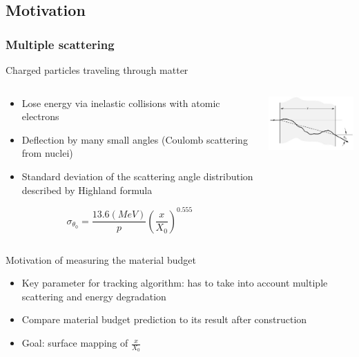 \documentclass{beamer}
\begin{document}
  \subsection{Motivation}

  \begin{frame}
    \frametitle{Multiple scattering}
    
    \vspace{-0.4cm} 
    \begin{block}{Charged particles traveling through matter}
      \vspace{-0.3cm}
      \begin{columns}[c]
        \begin{column}{5cm}
          \footnotesize
          \begin{itemize}
            \item Lose energy via inelastic collisions with atomic electrons
            \item Deflection by many small angles (Coulomb scattering from nuclei)
            \item Standard deviation of the scattering angle distribution described by Highland formula
          \end{itemize}
          \vspace{-0.1cm}
          \centering
            \[ \sigma_{\theta_0} = \frac{13.6 (MeV)}{p}\left( \frac{x}{X_0}\right)^{0.555}\]
        \end{column}
        \begin{column}{6cm}
          \centering
          \includegraphics[width = 5cm]{Pictures/multiple_scattering.jpg}
        \end{column}
      \end{columns}
    \end{block}

    \vspace{-0.3cm}
    \begin{block}{Motivation of measuring the material budget}
      \footnotesize
      \begin{itemize}
        \item Key parameter for tracking algorithm: has to take into account multiple scattering and energy degradation
        \item Compare material budget prediction to its result after construction
        \item Goal: surface mapping of $\frac{x}{X_0}$
      \end{itemize}
    \end{block}
  \end{frame} 
  
\end{document}
